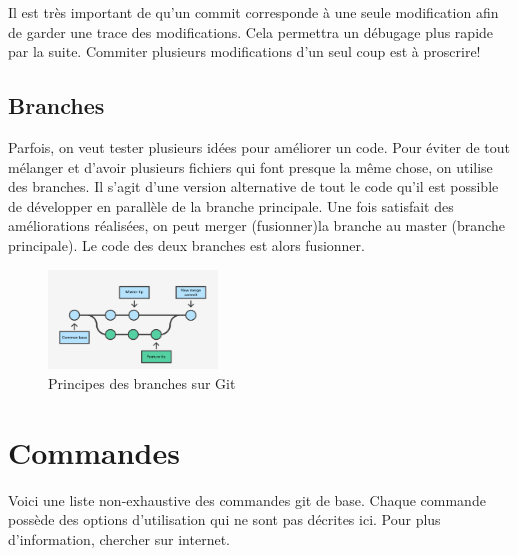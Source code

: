 \documentclass[a4paper, 11pt]{report}
\begin{document}
Il est très important de qu'un commit corresponde à une seule modification afin de garder une trace des modifications. Cela permettra un débugage plus rapide par la suite. Commiter plusieurs modifications d'un seul coup est à proscrire!

\subsection{Branches}
Parfois, on veut tester plusieurs idées pour améliorer un code. Pour éviter de tout mélanger et d'avoir plusieurs fichiers qui font presque la même chose, on utilise des branches. Il s'agit d'une version alternative de tout le code qu'il est possible de développer en parallèle de la branche principale. Une fois satisfait des améliorations réalisées, on peut merger (fusionner)la branche au master (branche principale). Le code des deux branches est alors fusionner.

\begin{figure}[h!]
\begin{centering}
\includegraphics[width=0.4\textwidth]{images/gitBranches.png}
\caption{Principes des branches sur Git}
\par\end{centering}
\end{figure}

\section{Commandes}
Voici une liste non-exhaustive des commandes git de base. Chaque commande possède des options d’utilisation qui ne sont pas décrites ici. Pour plus d'information, chercher sur internet.
\end{document}
